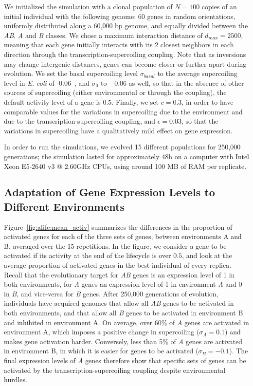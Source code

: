 We initialized the simulation with a clonal population of $N=100$ copies of an initial individual with the following genome: 60 genes in random orientations, uniformly distributed along a 60,000 bp genome, and equally divided between the \emph{AB}, \emph{A} and \emph{B} classes.
We chose a maximum interaction distance of $d_{max} = 2500$, meaning that each gene initially interacts with its 2 closest neighbors in each direction through the transcription-supercoiling coupling.
Note that as inversions may change intergenic distances, genes can become closer or further apart during evolution.
We set the basal supercoiling level $\sigma_{basal}$ to the average supercoiling level in \emph{E. coli} of -0.06~\citep{crozat2005}, and $\sigma_0$ to $-0.06$ as well, so that in the absence of other sources of supercoiling (either environmental or through the coupling), the default activity level of a gene is 0.5.
Finally, we set $c = 0.3$, in order to have comparable values for the variations in supercoiling due to the environment and due to the transcription-supercoiling coupling, and $\epsilon=0.03$, so that the variations in supercoiling have a qualitatively mild effect on gene expression.


In order to run the simulations, we evolved 15 different populations for 250,000 generations; the simulation lasted for approximately 48h on a computer with Intel Xeon E5-2640 v3 @ 2.60GHz CPUs, using around 100 MB of RAM per replicate.


\subsection{Adaptation of Gene Expression Levels to Different Environments}

Figure~\ref{fig:alife:mean_activ} summarizes the differences in the proportion of activated genes for each of the three sets of genes, between environments A and B, averaged over the 15 repetitions.
In the figure, we consider a gene to be activated if its activity at the end of the lifecycle is over $0.5$, and look at the average proportion of activated genes in the best individual of every replica.
Recall that the evolutionary target for \emph{AB} genes is an expression level of 1 in both environments, for \emph{A} genes an expression level of 1 in environment \emph{A} and 0 in \emph{B}, and vice-versa for \emph{B} genes.
After 250,000 generations of evolution, individuals have acquired genomes that allow all \emph{AB} genes to be activated in both environments, and that allow all \emph{B} genes to be activated in environment B and inhibited in environment A.
On average, over 60\% of \emph{A} genes are activated in environment A, which imposes a positive change in supercoiling ($\sigma_A = 0.1$) and makes gene activation harder.
Conversely, less than 5\% of \emph{A} genes are activated in environment B, in which it is easier for genes to be activated ($\sigma_B = -0.1$).
The final expression levels of \emph{A} genes therefore show that specific sets of genes can be activated by the transcription-supercoiling coupling despite environmental hurdles.


